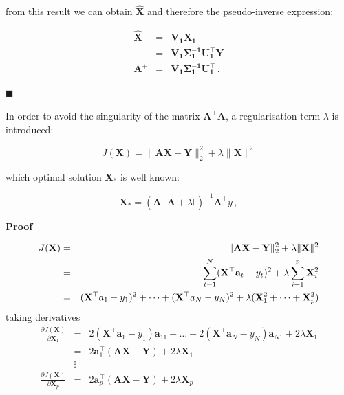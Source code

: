 \noindent from this result we can obtain $\mathbf{\hat{\mathbf{X}}}$ and
therefore the pseudo-inverse expression:

\begin{eqnarray*}
\mathbf{\hat{\mathbf{X}}} &=& \mathbf{V_1 \mathbf{X}_1} \\
                &=& \mathbf{V_1 \Sigma_1^{-1} U_1^\top Y} \\
\mathbf{A^+} &=& \mathbf{V_1 \Sigma_1^{-1} U_1^\top} \, .
\end{eqnarray*}

$\blacksquare$


In order to avoid the singularity of the matrix $\mathbf{A}^\top \mathbf{A}$, a regularisation term $\lambda$ is introduced: 

\begin{equation}
\label{eq:RRproblem} 
J(\mathbf{\mathbf{X}}) =  \| \mathbf{A}\mathbf{\mathbf{X}} - \mathbf{Y} \|_2^2  + \lambda
 \| \mathbf{\mathbf{X}}\| ^2
\end{equation}

\noindent which optimal solution $\mathbf{\mathbf{X}}_*$ is well known: 

\begin{equation*}
\label{eq:optsolRR}
\mathbf{\mathbf{X}}_*=(\mathbf{A}^\top \mathbf{A}+\lambda \mathbb{I})^{-1}\mathbf{A}^\top y \, ,
\end{equation*}

\textbf{Proof}\quad

\begin{eqnarray*}
J(\mathbf{\mathbf{X}}) &=&  \| \mathbf{A}\mathbf{\mathbf{X}} - \mathbf{Y} \|_2^2  + \lambda
 \| \mathbf{\mathbf{X}}\| ^2 \\
 &=&  \sum_{t=1}^N (\mathbf{\mathbf{X}}^\top {\bf a}_t-y_t)^2 + \lambda \sum_{i=1}^p \mathbf{X}_i^2 \\
 &=& (\mathbf{X}^\top a_1-y_1)^2 + \dots + (\mathbf{X}^\top a_N-y_N)^2 + \lambda (\mathbf{X}_1^2+\dots+\mathbf{X}_p^2)
\end{eqnarray*}
\noindent taking derivatives
 \begin{eqnarray*}
 \frac{\partial J(\mathbf{\mathbf{X}})}{\partial \mathbf{X}_1}&=& 
 2(\mathbf{X}^\top \mathbf{a}_1-y_1)\mathbf{a}_{11} + \dots + 2(\mathbf{X}^\top \mathbf{a}_N-y_N)\mathbf{a}_{N1} + 2\lambda \mathbf{X}_1 \\
 &=& 2\mathbf{a}_1^\top(\mathbf{A}\mathbf{X}-\mathbf{Y}) + 2\lambda\mathbf{X}_1\\
& \vdots &\\
  \frac{\partial J(\mathbf{\mathbf{X}})}{\partial \mathbf{X}_p}&=& 
 2\mathbf{a}_p^\top(\mathbf{A}\mathbf{X}-\mathbf{Y}) + 2\lambda\mathbf{X}_p 
\end{eqnarray*}


